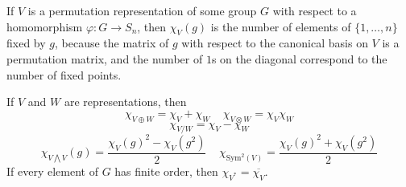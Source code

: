 \begin{example}
    If $V$ is a permutation representation of some group $G$ with respect to a homomorphism $\varphi: G \to S_n$, then $\chi_V(g)$ is the number of elements of $\{ 1, \dots, n \}$ fixed by $g$, because the matrix of $g$ with respect to the canonical basis on $V$ is a permutation matrix, and the number of $1$s on the diagonal correspond to the number of fixed points.
\end{example}

\begin{theorem}
    If $V$ and $W$ are representations, then
    \[ \chi_{V \oplus W} = \chi_V + \chi_W\ \ \ \ \ \chi_{V \otimes W} = \chi_V \chi_W \]
    \[ \chi_{V/W} = \chi_V - \chi_W \]
    \[ \chi_{V \bigwedge V}(g) = \frac{\chi_V(g)^2 - \chi_V(g^2)}{2}\ \ \ \ \ \chi_{\text{Sym}^2(V)} = \frac{\chi_V(g)^2 + \chi_V(g^2)}{2} \]
    If every element of $G$ has finite order, then $\chi_{V^*} = \overline{\chi_V}$.
\end{theorem}
